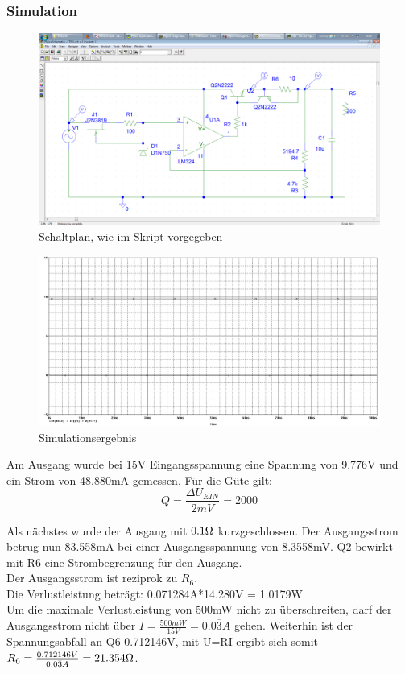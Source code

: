\subsubsection*{Simulation}
\begin{figure}[H]
	\centering
	\includegraphics[width=\linewidth]{versuch7/spice/s7511.png}
	\caption{Schaltplan, wie im Skript vorgegeben}
\end{figure}
\begin{figure}[H]
	\centering
	\includegraphics[width=\linewidth]{versuch7/spice/7511.png}
	\caption{Simulationsergebnis}
\end{figure}
Am Ausgang wurde bei 15V Eingangsspannung eine Spannung von 9.776V und ein Strom von 48.880mA gemessen.
Für die Güte gilt:
\[ Q=\frac{\Delta U_{EIN}}{2mV} = 2000 \]

Als nächstes wurde der Ausgang mit $ 0.1\Omega $ kurzgeschlossen. Der Ausgangsstrom betrug nun 83.558mA bei einer Ausgangsspannung von 8.3558mV. Q2 bewirkt mit R6 eine Strombegrenzung für den Ausgang.\\
Der Ausgangsstrom ist reziprok zu $ R_6 $.\\
Die Verlustleistung beträgt: 0.071284A*14.280V = 1.0179W\\
Um die maximale Verlustleistung von 500mW nicht zu überschreiten, darf der Ausgangsstrom nicht über $ I=\frac{500mW}{15V}=0.0\overline{3}A $ gehen. Weiterhin ist der Spannungsabfall an Q6 0.712146V, mit U=RI ergibt sich somit $ R_6 = \frac{0.712146V}{0.0\overline{3}A}=21.354\Omega $.

